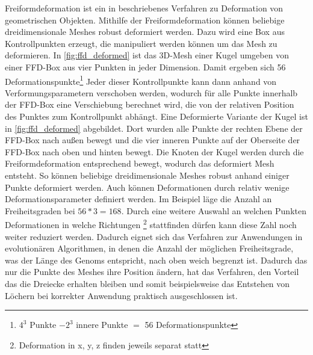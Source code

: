 Freiformdeformation ist ein in \cite{Sederberg.1986} beschriebenes Verfahren zu Deformation von geometrischen Objekten.
Mithilfe der Freiformdeformation können beliebige dreidimensionale Meshes robust deformiert werden.
Dazu wird eine Box aus Kontrollpunkten erzeugt, die manipuliert werden können um das Mesh zu deformieren.
In \cref{fig:ffd_deformed} ist das 3D-Mesh einer Kugel umgeben von einer FFD-Box aus vier Punkten in jeder Dimension.
Damit ergeben sich 56 Deformationspunkte\footnote{$4^3$ Punkte $- 2^3$ innere Punkte $=$ 56 Deformationspunkte} 
Jeder dieser Kontrollpunkte kann dann anhand von Verformungsparametern verschoben werden, wodurch für alle Punkte innerhalb der FFD-Box eine Verschiebung berechnet wird, die von der relativen Position des Punktes zum Kontrollpunkt abhängt.
Eine Deformierte Variante der Kugel ist in \cref{fig:ffd_deformed} abgebildet.
Dort wurden alle Punkte der rechten Ebene der FFD-Box nach außen bewegt und die vier inneren Punkte auf der Oberseite der FFD-Box nach oben und hinten bewegt.
Die Knoten der Kugel werden durch die Freiformdeformation entsprechend bewegt, wodurch das deformiert Mesh entsteht.
So können beliebige dreidimensionale Meshes robust anhand einiger Punkte deformiert werden.
Auch können Deformationen durch relativ wenige Deformationsparameter definiert werden.
Im Beispiel läge die Anzahl an Freiheitsgraden bei $56 * 3 = 168$.
Durch eine weitere Auswahl an welchen Punkten Deformationen in welche Richtungen 
\footnote{Deformation in x, y, z finden jeweils separat statt}
stattfinden dürfen kann diese Zahl noch weiter reduziert werden.
Dadurch eignet sich das Verfahren zur Anwendungen in evolutionären Algorithmen, in denen die Anzahl der möglichen Freiheitsgrade, was der Länge des Genoms entspricht, nach oben weich begrenzt ist.
Dadurch das nur die Punkte des Meshes ihre Position ändern, hat das Verfahren, den Vorteil das die Dreiecke erhalten bleiben und somit beispielsweise das Entstehen von Löchern bei korrekter Anwendung praktisch ausgeschlossen ist.

